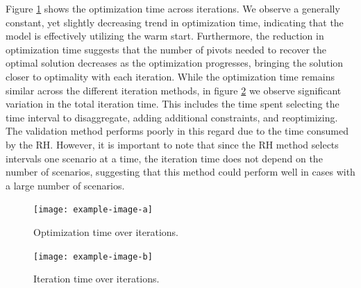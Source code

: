 {Figure \ref{fig:opt_time_over_iter} shows the optimization time across iterations.
 We observe a generally constant, yet slightly decreasing trend in optimization time, indicating that the model is effectively utilizing the warm start. Furthermore, the reduction in optimization time suggests that the number of pivots needed to recover the optimal solution decreases as the optimization progresses, bringing the solution closer to optimality with each iteration.
 While the optimization time remains similar across the different iteration methods, in figure \ref{fig:iter_time_over_iter} we observe significant variation in the total iteration time. This includes the time spent selecting the time interval to disaggregate, adding additional constraints, and reoptimizing. 
 The validation method performs poorly in this regard due to the time consumed by the RH. However, it is important to note that since the RH method selects intervals one scenario at a time, the iteration time does not depend on the number of scenarios, suggesting that this method could perform well in cases with a large number of scenarios.
 

\begin{figure}[H]
  \centering
  \texttt{[image: example-image-a]}%
  \caption{Optimization time over iterations.}
  \label{fig:opt_time_over_iter}
\end{figure}

\begin{figure}[H]
  \centering
  \texttt{[image: example-image-b]}%
  \caption{Iteration time over iterations.}
  \label{fig:iter_time_over_iter}
\end{figure}

















}

